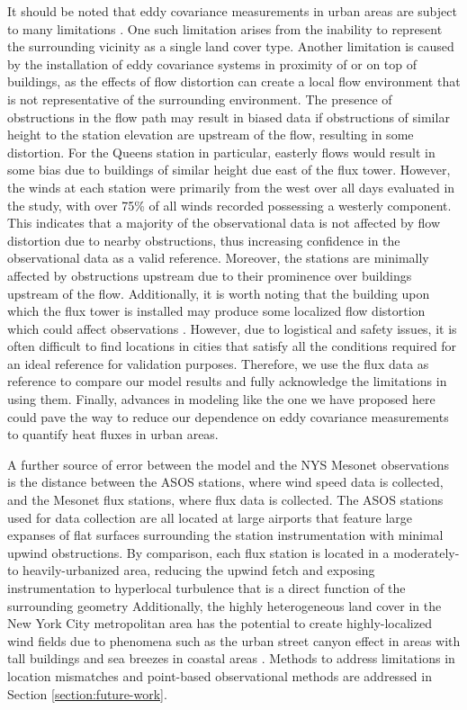 It should be noted that eddy covariance measurements in urban areas are subject to many limitations \citep{aubinet_vesala_papale_2012}. One such limitation arises from the inability to represent the surrounding vicinity as a single land cover type. Another limitation is caused by the installation of eddy covariance systems in proximity of or on top of buildings, as the effects of flow distortion can create a local flow environment that is not representative of the surrounding environment. The presence of obstructions in the flow path may result in biased data if obstructions of similar height to the station elevation are upstream of the flow, resulting in some distortion. For the Queens station in particular, easterly flows would result in some bias due to buildings of similar height due east of the flux tower. However, the winds at each station were primarily from the west over all days evaluated in the study, with over 75\% of all winds recorded possessing a westerly component. This indicates that a majority of the observational data is not affected by flow distortion due to nearby obstructions, thus increasing confidence in the observational data as a valid reference. Moreover, the stations are minimally affected by obstructions upstream due to their prominence over buildings upstream of the flow. Additionally, it is worth noting that the building upon which the flux tower is installed may produce some localized flow distortion which could affect observations \citep{Oke_2017, Wang_2021_LES}. However, due to  logistical and safety issues, it is often difficult to find locations in cities that satisfy all the conditions required for an ideal reference for validation purposes. Therefore, we use the flux data as reference to compare our model results and fully acknowledge the limitations in using them. Finally, advances in modeling like the one we have proposed here could pave the way to reduce our dependence on eddy covariance measurements to quantify heat fluxes in urban areas.

A further source of error between the model and the NYS Mesonet observations is the distance between the ASOS stations, where wind speed data is collected, and the Mesonet flux stations, where flux data is collected. The ASOS stations used for data collection are all located at large airports that feature large expanses of flat surfaces surrounding the station instrumentation with minimal upwind obstructions. By comparison, each flux station is located in a moderately- to heavily-urbanized area, reducing the upwind fetch and exposing instrumentation to hyperlocal turbulence that is a direct function of the surrounding geometry \citep{Kastner_2004} Additionally, the highly heterogeneous land cover in the New York City metropolitan area has the potential to create highly-localized wind fields due to phenomena such as the urban street canyon effect in areas with tall buildings and sea breezes in coastal areas \citep{Park_2012, Thompson_2007}.  Methods to address limitations in location mismatches and point-based observational methods are addressed in Section \ref{section:future-work}.

